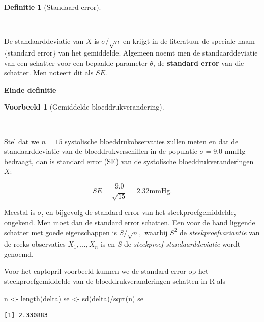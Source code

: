 \documentclass[
  dutch,
  letterpaper,
  12pt]{book}
\newenvironment{Shaded}{\begin{snugshade}}{\end{snugshade}}
\newcommand{\FunctionTok}[1]{\textcolor[rgb]{0.28,0.35,0.67}{#1}}
\newcommand{\NormalTok}[1]{\textcolor[rgb]{0.00,0.23,0.31}{#1}}
\newcommand{\OtherTok}[1]{\textcolor[rgb]{0.00,0.23,0.31}{#1}}
\newcommand{\SpecialCharTok}[1]{\textcolor[rgb]{0.37,0.37,0.37}{#1}}
\theoremstyle{definition}
\theoremstyle{definition}
\newtheorem{definition}{Definitie}[chapter]
\theoremstyle{definition}
\newtheorem{example}{Voorbeeld}[chapter]
\theoremstyle{remark}
\begin{document}
\begin{definition}[Standaard
error]\protect\hypertarget{def-standaard-error}{}\label{def-standaard-error}

~

\end{definition}

De standaarddeviatie van \(\bar{X}\) is \(\sigma/\sqrt{n}\) en krijgt in
de literatuur de speciale naam \{standard error\} van het gemiddelde.
Algemeen noemt men de standaarddeviatie van een schatter voor een
bepaalde parameter \(\theta\), de \textbf{standard error} van die
schatter. Men noteert dit als \(SE\).

\textbf{Einde definitie}

\begin{example}[Gemiddelde
bloeddrukverandering]\protect\hypertarget{exm-gemiddelde-bloeddrukverandering}{}\label{exm-gemiddelde-bloeddrukverandering}

~

\end{example}

Stel dat we \(n = 15\) systolische bloeddrukobservaties zullen meten en
dat de standaarddeviatie van de bloeddrukverschillen in de populatie
\(\sigma = 9.0\) mmHg bedraagt, dan is standard error (SE) van de
systolische bloeddrukveranderingen \(\bar X\):

\[
SE= \frac{9.0}{\sqrt{15}}=2.32\text{mmHg.}
\]

Meestal is \(\sigma\), en bijgevolg de standard error van het
steekproefgemiddelde, ongekend. Men moet dan de standard error schatten.
Een voor de hand liggende schatter met goede eigenschappen is
\(S/\sqrt{n},\) waarbij \(S^2\) de \emph{steekproefvariantie} van de
reeks observaties \(X_1,...,X_n\) is en \(S\) de \emph{steekproef
standaarddeviatie} wordt genoemd.

Voor het captopril voorbeeld kunnen we de standard error op het
steekproefgemiddelde van de bloeddrukveranderingen schatten in R als

\begin{Shaded}
\begin{Highlighting}[]
\NormalTok{n }\OtherTok{\textless{}{-}} \FunctionTok{length}\NormalTok{(delta)}
\NormalTok{se }\OtherTok{\textless{}{-}} \FunctionTok{sd}\NormalTok{(delta)}\SpecialCharTok{/}\FunctionTok{sqrt}\NormalTok{(n)}
\NormalTok{se}
\end{Highlighting}
\end{Shaded}

\begin{verbatim}
[1] 2.330883
\end{verbatim}
\end{document}
